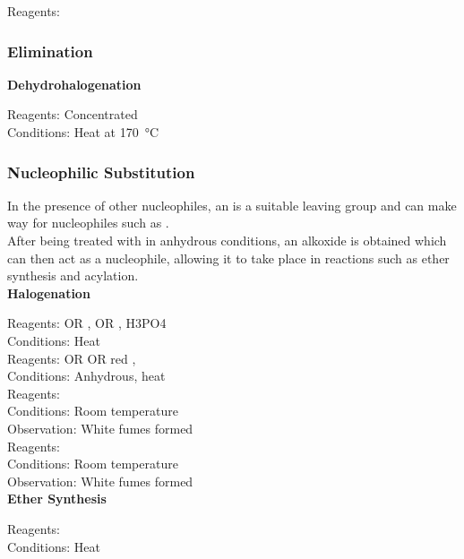 \documentclass[../main]{subfiles}
\begin{document}
	Reagents:  \\


	\subsubsection{Elimination}

	\noindent \textbf{Dehydrohalogenation}

	Reagents: Concentrated  \\
	Conditions: Heat at \SI{170}{\celsius}\\

	\subsubsection{Nucleophilic Substitution}

	In the presence of other nucleophiles, an  is a suitable leaving group and can make way for nucleophiles such as . \\

	After being treated with  in anhydrous conditions, an alkoxide  is obtained which can then act as a nucleophile, allowing it to take place in reactions such as ether synthesis and acylation. \\

	\noindent \textbf{Halogenation}

	Reagents:  OR ,  OR , {H3PO4} \\
	Conditions:  Heat \\

	Reagents:  OR  OR red ,  \\
	Conditions:  Anhydrous, heat \\

	Reagents:  \\
	Conditions:  Room temperature \\
	Observation: White fumes formed  \\

	Reagents:  \\
	Conditions:  Room temperature \\
	Observation: White fumes formed  \\

	\noindent \textbf{Ether Synthesis}

	Reagents:  \\
	Conditions:  Heat \\
\end{document}
